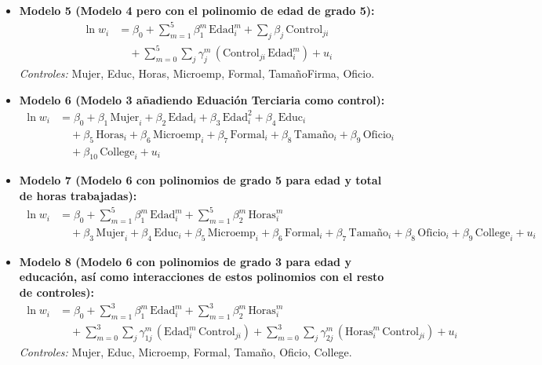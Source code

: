 \documentclass[12pt,a4paper,onecolumn]{article}
\begin{document}
\begin{itemize}
\item \textbf{Modelo 5 (Modelo 4 pero con el polinomio de edad de grado 5):}
{\small
\[
\begin{aligned}
\ln w_{i} &= \beta_{0} 
+ \sum_{m=1}^{5} \beta_{1}^{m}\,\text{Edad}_{i}^{m}
+ \sum_{j} \beta_{j}\,\text{Control}_{ji}
\\&\quad
+ \sum_{m=0}^{5}\sum_{j} \gamma_{j}^{m}\,(\text{Control}_{ji}\,\text{Edad}_{i}^{m})
+ u_{i}
\end{aligned}
\]
}
\emph{Controles:} Mujer, Educ, Horas, Microemp, Formal, TamañoFirma, Oficio.

\item \textbf{Modelo 6 (Modelo 3 añadiendo Eduación Terciaria como control):}
{\small
\[
\begin{aligned}
\ln w_{i} &= \beta_{0} 
+ \beta_{1}\,\text{Mujer}_{i}
+ \beta_{2}\,\text{Edad}_{i}
+ \beta_{3}\,\text{Edad}_{i}^{2}
+ \beta_{4}\,\text{Educ}_{i}
\\&\quad
+ \beta_{5}\,\text{Horas}_{i}
+ \beta_{6}\,\text{Microemp}_{i}
+ \beta_{7}\,\text{Formal}_{i}
+ \beta_{8}\,\text{Tamaño}_{i}
+ \beta_{9}\,\text{Oficio}_{i}
\\&\quad
+ \beta_{10}\,\text{College}_{i}
+ u_{i}
\end{aligned}
\]
}

\item \textbf{Modelo 7 (Modelo 6 con polinomios de grado 5 para edad y total de horas trabajadas):}
{\small
\[
\begin{aligned}
\ln w_{i} &= \beta_{0} 
+ \sum_{m=1}^{5} \beta_{1}^{m}\,\text{Edad}_{i}^{m}
+ \sum_{m=1}^{5} \beta_{2}^{m}\,\text{Horas}_{i}^{m}
\\&\quad
+ \beta_{3}\,\text{Mujer}_{i}
+ \beta_{4}\,\text{Educ}_{i}
+ \beta_{5}\,\text{Microemp}_{i}
+ \beta_{6}\,\text{Formal}_{i}
+ \beta_{7}\,\text{Tamaño}_{i}
+ \beta_{8}\,\text{Oficio}_{i}
+ \beta_{9}\,\text{College}_{i}
+ u_{i}
\end{aligned}
\]
}

\item \textbf{Modelo 8 (Modelo 6 con polinomios de grado 3 para edad y educación, así como interacciones de estos polinomios con el resto de controles):}
{\small
\[
\begin{aligned}
\ln w_{i} &= \beta_{0} 
+ \sum_{m=1}^{3} \beta_{1}^{m}\,\text{Edad}_{i}^{m}
+ \sum_{m=1}^{3} \beta_{2}^{m}\,\text{Horas}_{i}^{m}
\\&\quad
+ \sum_{m=0}^{3}\sum_{j} \gamma_{1j}^{m}\,(\text{Edad}_{i}^{m}\,\text{Control}_{ji})
+ \sum_{m=0}^{3}\sum_{j} \gamma_{2j}^{m}\,(\text{Horas}_{i}^{m}\,\text{Control}_{ji})
+ u_{i}
\end{aligned}
\]
}
\emph{Controles:} Mujer, Educ, Microemp, Formal, Tamaño, Oficio, College.

\end{itemize}
\end{document}
